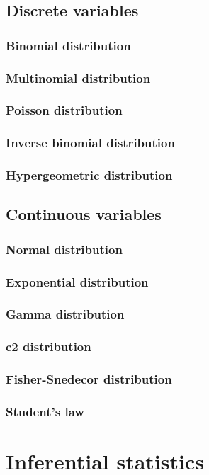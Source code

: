 \documentclass{report}
\begin{document}
	\section{Discrete variables}
		\subsection{Binomial distribution}
		\subsection{Multinomial distribution}
		\subsection{Poisson distribution}
		\subsection{Inverse binomial distribution}
		\subsection{Hypergeometric distribution}
	\section{Continuous variables}
		\subsection{Normal distribution}
		\subsection{Exponential distribution}
		\subsection{Gamma distribution}
		\subsection{c2 distribution}
		\subsection{Fisher-Snedecor distribution}
		\subsection{Student’s law}

\chapter{Inferential statistics}\label{chap:inferential}
\end{document}
